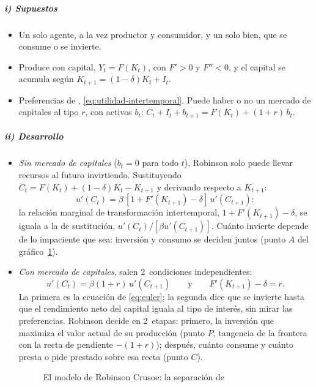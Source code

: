 \documentclass[11pt]{article}
\begin{document}
\subparagraph{i) Supuestos}

\begin{itemize}
\item Un solo agente, a la vez productor y consumidor, y un solo bien, que se consume o se invierte.
\item Produce con capital, $Y_t=F(K_t)$, con $F'>0$ y $F''<0$, y el capital se acumula según $K_{t+1}=(1-\delta)K_t+I_t$.
\item Preferencias de , \eqref{eq:utilidad-intertemporal}. Puede haber o no un mercado de capitales al tipo $r$, con activos $b_t$: $C_t+I_t+b_{t+1}=F(K_t)+(1+r)\,b_t$.
\end{itemize}

\subparagraph{ii) Desarrollo}

\begin{itemize}
\item \emph{Sin mercado de capitales} ($b_t=0$ para todo $t$), Robinson solo puede llevar recursos al futuro invirtiendo. Sustituyendo $C_t=F(K_t)+(1-\delta)K_t-K_{t+1}$ y derivando respecto a $K_{t+1}$:
  \begin{equation*}
  u'(C_t)=\beta\,\left[1+F'(K_{t+1})-\delta\right]\,u'(C_{t+1}):
  \end{equation*}
  la relación marginal de transformación intertemporal, $1+F'(K_{t+1})-\delta$, se iguala a la de sustitución, $u'(C_t)/[\beta u'(C_{t+1})]$. Cuánto invierte depende de lo impaciente que sea: inversión y consumo se deciden juntos (punto $A$ del gráfico~\ref{fig:robinson}).
\item \emph{Con mercado de capitales}, salen 2~condiciones independientes:
  \begin{equation*}
  u'(C_t)=\beta(1+r)\,u'(C_{t+1})\qquad\text{y}\qquad F'(K_{t+1})-\delta=r.
  \end{equation*}
  La primera es la ecuación de  \eqref{eq:euler}; la segunda dice que se invierte hasta que el rendimiento neto del capital iguala al tipo de interés, sin mirar las preferencias. Robinson decide en 2~etapas: primero, la inversión que maximiza el valor actual de su producción (punto $P$, tangencia de la frontera con la recta de pendiente $-(1+r)$); después, cuánto consume y cuánto presta o pide prestado sobre esa recta (punto $C$).
  \begin{figure}[H]
  \centering
  \caption{El modelo de Robinson Crusoe: la separación de }\label{fig:robinson}
  \end{figure}
\end{itemize}
\end{document}
